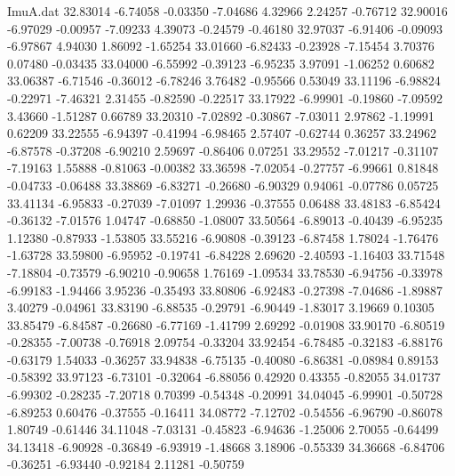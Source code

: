 \begin{filecontents}{ImuA.dat}
  32.83014   -6.74058   -0.03350   -7.04686    4.32966    2.24257   -0.76712
  32.90016   -6.97029   -0.00957   -7.09233    4.39073   -0.24579   -0.46180
  32.97037   -6.91406   -0.09093   -6.97867    4.94030    1.86092   -1.65254
  33.01660   -6.82433   -0.23928   -7.15454    3.70376    0.07480   -0.03435
  33.04000   -6.55992   -0.39123   -6.95235    3.97091   -1.06252    0.60682
  33.06387   -6.71546   -0.36012   -6.78246    3.76482   -0.95566    0.53049
  33.11196   -6.98824   -0.22971   -7.46321    2.31455   -0.82590   -0.22517
  33.17922   -6.99901   -0.19860   -7.09592    3.43660   -1.51287    0.66789
  33.20310   -7.02892   -0.30867   -7.03011    2.97862   -1.19991    0.62209
  33.22555   -6.94397   -0.41994   -6.98465    2.57407   -0.62744    0.36257
  33.24962   -6.87578   -0.37208   -6.90210    2.59697   -0.86406    0.07251
  33.29552   -7.01217   -0.31107   -7.19163    1.55888   -0.81063   -0.00382
  33.36598   -7.02054   -0.27757   -6.99661    0.81848   -0.04733   -0.06488
  33.38869   -6.83271   -0.26680   -6.90329    0.94061   -0.07786    0.05725
  33.41134   -6.95833   -0.27039   -7.01097    1.29936   -0.37555    0.06488
  33.48183   -6.85424   -0.36132   -7.01576    1.04747   -0.68850   -1.08007
  33.50564   -6.89013   -0.40439   -6.95235    1.12380   -0.87933   -1.53805
  33.55216   -6.90808   -0.39123   -6.87458    1.78024   -1.76476   -1.63728
  33.59800   -6.95952   -0.19741   -6.84228    2.69620   -2.40593   -1.16403
  33.71548   -7.18804   -0.73579   -6.90210   -0.90658    1.76169   -1.09534
  33.78530   -6.94756   -0.33978   -6.99183   -1.94466    3.95236   -0.35493
  33.80806   -6.92483   -0.27398   -7.04686   -1.89887    3.40279   -0.04961
  33.83190   -6.88535   -0.29791   -6.90449   -1.83017    3.19669    0.10305
  33.85479   -6.84587   -0.26680   -6.77169   -1.41799    2.69292   -0.01908
  33.90170   -6.80519   -0.28355   -7.00738   -0.76918    2.09754   -0.33204
  33.92454   -6.78485   -0.32183   -6.88176   -0.63179    1.54033   -0.36257
  33.94838   -6.75135   -0.40080   -6.86381   -0.08984    0.89153   -0.58392
  33.97123   -6.73101   -0.32064   -6.88056    0.42920    0.43355   -0.82055
  34.01737   -6.99302   -0.28235   -7.20718    0.70399   -0.54348   -0.20991
  34.04045   -6.99901   -0.50728   -6.89253    0.60476   -0.37555   -0.16411
  34.08772   -7.12702   -0.54556   -6.96790   -0.86078    1.80749   -0.61446
  34.11048   -7.03131   -0.45823   -6.94636   -1.25006    2.70055   -0.64499
  34.13418   -6.90928   -0.36849   -6.93919   -1.48668    3.18906   -0.55339
  34.36668   -6.84706   -0.36251   -6.93440   -0.92184    2.11281   -0.50759

\end{filecontents}
